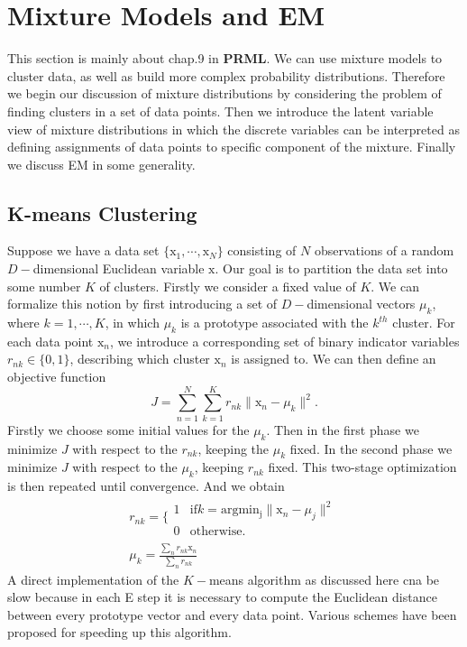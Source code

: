 \documentclass[a4paper]{book}
\newcommand{\mrm}{\mathrm}
\begin{document}
\section{Mixture Models and EM}
This section is mainly about chap.9 in \textbf{PRML}.\newline
We can use mixture models to cluster data, as well as build more complex probability distributions. Therefore we begin our discussion of mixture distributions by considering the problem of finding clusters in a set of data points. Then we introduce the latent variable view of mixture distributions in which the discrete variables can be interpreted as defining assignments of data points to specific component of the mixture. Finally we discuss EM in some generality.
\subsection{K-means Clustering}
Suppose we have a data set $\{\mrm x_1,\cdots, \mrm x_N\}$ consisting of $N$ observations of a random $D-$dimensional Euclidean variable $\mrm x$. Our goal is to partition the data set into some number $K$ of clusters.  Firstly we consider a fixed value of $K$. We can formalize this notion by first introducing a set of $D-$dimensional vectors $\mu_k$, where $k=1,\cdots,K$, in which $\mu_k$ is a prototype associated with the $k^{th}$ cluster. For each data point $\mrm x_n$, we introduce a corresponding set of binary indicator variables $r_{nk} \in \{0,1\}$, describing which cluster $\mrm x_n$ is assigned to. We can then define an objective function
\begin{equation}
J = \sum_{n=1}^{N}\sum_{k=1}^{K}r_{nk}\|\mrm x_n-\mu_k\|^2.
\end{equation}
Firstly we choose some initial values for the $\mu_k$. Then in the first phase we minimize $J$ with respect to the $r_{nk}$, keeping the $\mu_k$ fixed. In the second phase we minimize $J$ with respect to the $\mu_k$, keeping $r_{nk}$ fixed. This two-stage optimization is then repeated until convergence. And we obtain
\begin{gather}\label{}
  r_{nk}=\{\begin{matrix}
                 1 & \mrm{if }k=\mrm{arg min_j}\|\mrm x_n-\mu_j\|^2 \\
                 0 & \mrm{otherwise}.
               \end{matrix} \\
  \mu_k = \frac{\sum_nr_{nk}\mrm x_n}{\sum_nr_{nk}}
\end{gather}
A direct implementation of the $K-$means algorithm as discussed here cna be slow because in each E step it is necessary to compute the Euclidean distance between every prototype vector and every data point. Various schemes have been proposed for speeding up this algorithm.
\end{document}
